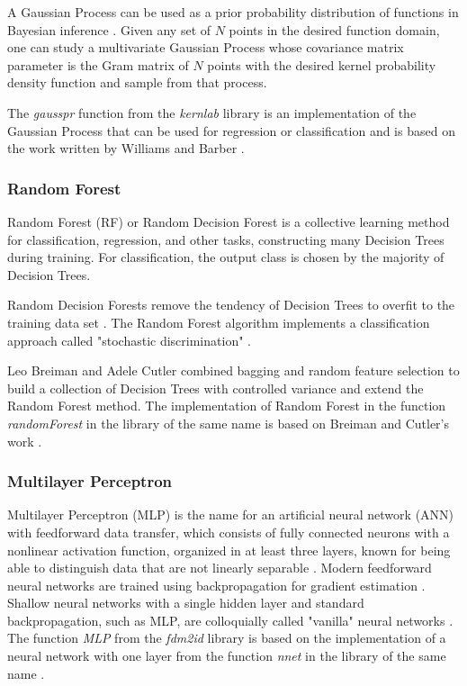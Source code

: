 \let\LaTeXcline\cline\documentclass[sn-mathphys-num]{sn-jnl}\let\cline\LaTeXcline
\begin{document}
A Gaussian Process can be used as a prior probability distribution of functions in Bayesian inference \cite{Rasmussen2005, Liu2010}. Given any set of $N$ points in the desired function domain, one can study a multivariate Gaussian Process whose covariance matrix parameter is the Gram matrix of $N$ points with the desired kernel probability density function and sample from that process.

The \textit{gausspr} function from the \textit{kernlab} library \cite{Karatzoglou2004} is an implementation of the Gaussian Process that can be used for regression or classification and is based on the work written by Williams and Barber \cite{Williams1998}.

\subsubsection{Random Forest}

Random Forest (RF) or Random Decision Forest is a collective learning method for classification, regression, and other tasks, constructing many Decision Trees during training. For classification, the output class is chosen by the majority of Decision Trees.

Random Decision Forests remove the tendency of Decision Trees to overfit to the training data set \cite{Ho1995}. The Random Forest algorithm implements a classification approach called "stochastic discrimination" \cite{Kleinberg1990, Kleinberg1996, Kleinberg2000}. 

Leo Breiman \cite{Breiman2001} and Adele Cutler \cite{Breiman2002} combined bagging and random feature selection \cite{Ho1995, Amit1997} to build a collection of Decision Trees with controlled variance and extend the Random Forest method. The implementation of Random Forest in the function \textit{randomForest} in the library of the same name is based on Breiman and Cutler's work \cite{Breiman2001, Breiman2002}.

\subsubsection{Multilayer Perceptron}

Multilayer Perceptron (MLP) is the name for an artificial neural network (ANN) with feedforward data transfer, which consists of fully connected neurons with a nonlinear activation function, organized in at least three layers, known for being able to distinguish data that are not linearly separable \cite{Cybenko1989}. Modern feedforward neural networks are trained using backpropagation for gradient estimation \cite{Linnainmaa1976, Kelley1960, Rosenblatt1962, Werbos1970, Rumelhart1987}. Shallow neural networks with a single hidden layer and standard backpropagation, such as MLP, are colloquially called "vanilla" neural networks \cite{Hastie2009}. The function \textit{MLP} from the \textit{fdm2id} library \cite{Blansche2019} is based on the implementation of a neural network with one layer from the function \textit{nnet} in the library of the same name \cite{Ripley2009}.
\end{document}
